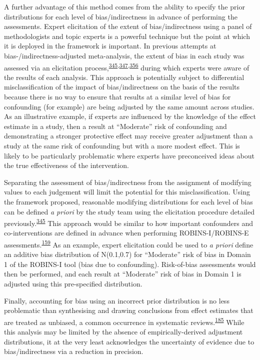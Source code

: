 \documentclass[a4paper, twoside]{templates/ociamthesis}
\begin{document}
A further advantage of this method comes from the ability to specify the prior distributions for each level of bias/indirectness in advance of performing the assessments. Expert elicitation of the extent of bias/indirectness using a panel of methodologists and topic experts is a powerful technique but the point at which it is deployed in the framework is important. In previous attempts at bias-/indirectness-adjusted meta-analysis, the extent of bias in each study was assessed via an elicitation process,\textsuperscript{\protect\hyperlink{ref-turner2009}{345},\protect\hyperlink{ref-thompson2011}{347},\protect\hyperlink{ref-wilks2011}{356}} during which experts were aware of the results of each analysis. This approach is potentially subject to differential misclassification of the impact of bias/indirectness on the basis of the results because there is no way to ensure that results at a similar level of bias for confounding (for example) are being adjusted by the same amount across studies. As an illustrative example, if experts are influenced by the knowledge of the effect estimate in a study, then a result at ``Moderate'' risk of confounding and demonstrating a stronger protective effect may receive greater adjustment than a study at the same risk of confounding but with a more modest effect. This is likely to be particularly problematic where experts have preconceived ideas about the true effectiveness of the intervention.

Separating the assessment of bias/indirectness from the assignment of modifying values to each judgement will limit the potential for this misclassification. Using the framework proposed, reasonable modifying distributions for each level of bias can be defined \emph{a priori} by the study team using the elicitation procedure detailed previously.\textsuperscript{\protect\hyperlink{ref-turner2009}{345}} This approach would be similar to how important confounders and co-interventions are defined in advance when performing ROBINS-I/ROBINS-E assessments.\textsuperscript{\protect\hyperlink{ref-sterne2016}{159}} As an example, expert elicitation could be used to \emph{a priori} define an additive bias distribution of N(0.1,0.7) for ``Moderate'' risk of bias in Domain 1 of the ROBINS-I tool (bias due to confounding). Risk-of-bias assessments would then be performed, and each result at ``Moderate'' risk of bias in Domain 1 is adjusted using this pre-specified distribution.

Finally, accounting for bias using an incorrect prior distribution is no less problematic than synthesising and drawing conclusions from effect estimates that are treated as unbiased, a common occurrence in systematic reviews.\textsuperscript{\protect\hyperlink{ref-katikireddi2015}{185}} While this analysis may be limited by the absence of empirically-derived adjustment distributions, it at the very least acknowledges the uncertainty of evidence due to bias/indirectness via a reduction in precision.
\end{document}
